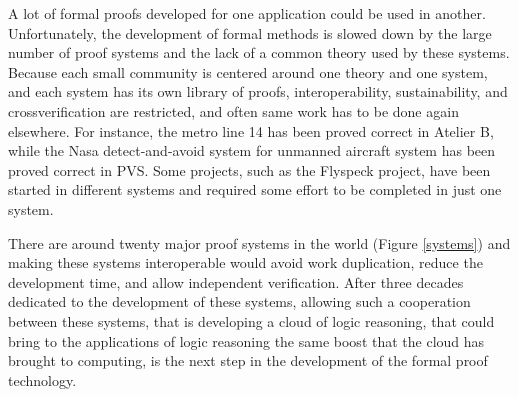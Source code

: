 A lot of formal proofs developed for one application could be used in
another.  Unfortunately, the development of formal methods is slowed
down by the large number of proof systems and the lack of a common
theory used by these systems.  Because each small community is
centered around one theory and one system, and each system has its own
library of proofs, interoperability, sustainability, and
crossverification are restricted, and often same work has to be done
again elsewhere.  For instance, the metro line 14 has been proved
correct in {\sc Atelier B}, while the Nasa detect-and-avoid system for
unmanned aircraft system has been proved correct in {\sc PVS}. Some
projects, such as the Flyspeck project, have been started in different
systems and required some effort to be completed in just one system.

There are around twenty major proof systems in the world (Figure
\ref{systems}) and making these systems interoperable would avoid work
duplication, reduce the development time, and allow independent
verification.  After three decades dedicated to the development of
these systems, allowing such a cooperation between these systems, that
is developing a cloud of logic reasoning, that could bring to the
applications of logic reasoning the same boost that the cloud has
brought to computing, is the next step in the development of the
formal proof technology.

